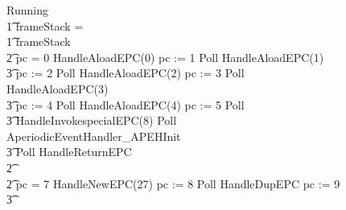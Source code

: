 \begin{figure}[t!]
  \setlength{\zedindent}{0cm}
  \setlength{\zedtab}{0.3cm}
  \setlength{\zedleftsep}{0.1cm}
  \begin{circus}
    Running \circdef \\
    \t1 \circif frameStack = \emptyset \circthen \Skip \\
    \t1 {} \circelse frameStack \neq \emptyset \circthen {} \\
    \t2 {} \circif pc = 0 \circthen HandleAloadEPC(0) \circseq pc := 1 \circseq Poll \circseq HandleAloadEPC(1) \circseq \\
    \t3 pc := 2 \circseq Poll \circseq HandleAloadEPC(2) \circseq pc := 3 \circseq Poll \circseq HandleAloadEPC(3) \circseq \\
    \t3 pc := 4 \circseq Poll \circseq HandleAloadEPC(4) \circseq pc := 5 \circseq Poll \circseq \\
    \t3 HandleInvokespecialEPC(8) \circseq Poll \circseq AperiodicEventHandler\_APEHInit \circseq \\
    \t3 Poll \circseq HandleReturnEPC \\
    \t2 {} \cdots {} \\
    \t2 {} \circelse pc = 7 \circthen HandleNewEPC(27) \circseq pc := 8 \circseq Poll \circseq HandleDupEPC \circseq pc := 9 \circseq \\
    \t3 {} \cdots {} \\

\end{circus}
\end{figure}
